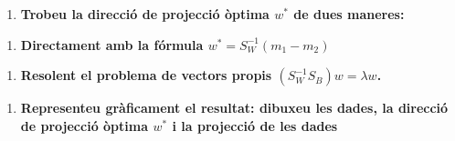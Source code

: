 \documentclass[a4paper]{article}
\begin{document}
\begin{enumerate}[resume=main]
	\item \textbf{Trobeu la direcció de projecció òptima $w^*$ de dues maneres:}
\end{enumerate}

\begin{enumerate}[resume=second,label=(\alph*),itemindent=1em]
	\item \textbf{Directament amb la fórmula $w^* = S_W^{-1} (m_1 - m_2)$}
\end{enumerate}

\begin{enumerate}[resume=second,label=(\alph*),itemindent=1em]
	\item \textbf{Resolent el problema de vectors propis $(S_W^{-1}S_B)w = \lambda w$.}
\end{enumerate}

\begin{enumerate}[resume=main]
	\item \textbf{Representeu gràficament el resultat: dibuxeu les dades, la direcció de projecció òptima $w^*$ i la projecció de les dades}
\end{enumerate}
\end{document}

